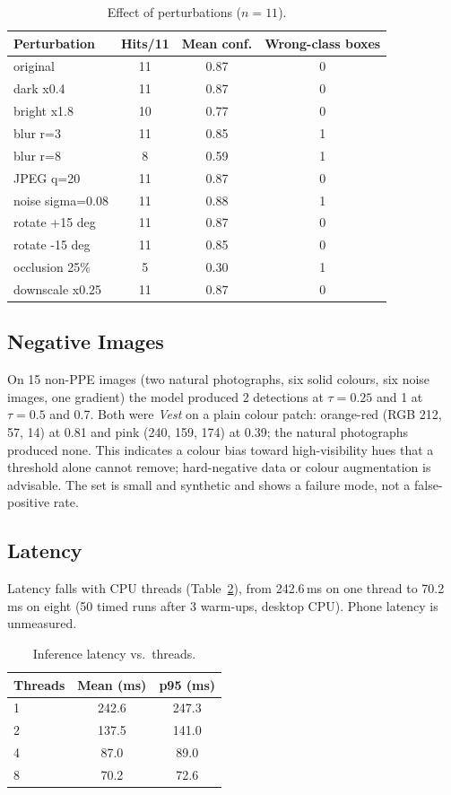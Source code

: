 \documentclass[conference]{IEEEtran}
\begin{document}
\begin{table}[t]
\caption{Effect of perturbations ($n=11$).}
\label{tab:pert}
\centering\footnotesize
\begin{tabular}{lccc}
\toprule
Perturbation & Hits/11 & Mean conf. & Wrong-class boxes \\
\midrule
original & 11 & 0.87 & 0 \\
dark x0.4 & 11 & 0.87 & 0 \\
bright x1.8 & 10 & 0.77 & 0 \\
blur r=3 & 11 & 0.85 & 1 \\
blur r=8 & 8 & 0.59 & 1 \\
JPEG q=20 & 11 & 0.87 & 0 \\
noise sigma=0.08 & 11 & 0.88 & 1 \\
rotate +15 deg & 11 & 0.87 & 0 \\
rotate -15 deg & 11 & 0.85 & 0 \\
occlusion 25\% & 5 & 0.30 & 1 \\
downscale x0.25 & 11 & 0.87 & 0 \\
\bottomrule
\end{tabular}
\end{table}

\subsection{Negative Images}
On 15 non-PPE images (two natural photographs, six solid colours, six noise
images, one gradient) the model produced 2 detections at $\tau=0.25$ and 1 at
$\tau=0.5$ and 0.7. Both were \emph{Vest} on a plain colour patch: orange-red
(RGB 212, 57, 14) at 0.81 and pink (240, 159, 174) at 0.39; the natural photographs
produced none. This indicates a colour bias toward high-visibility hues that a
threshold alone cannot remove; hard-negative data or colour augmentation is
advisable. The set is small and synthetic and shows a failure mode, not a
false-positive rate.

\subsection{Latency}
Latency falls with CPU threads (Table~\ref{tab:lat}), from 242.6\,ms on one
thread to 70.2\,ms on eight (50 timed runs after 3 warm-ups, desktop CPU). Phone
latency is unmeasured.

\begin{table}[t]
\caption{Inference latency vs.\ threads.}
\label{tab:lat}
\centering\footnotesize
\begin{tabular}{lcc}
\toprule
Threads & Mean (ms) & p95 (ms)\\
\midrule
1 & 242.6 & 247.3 \\
2 & 137.5 & 141.0 \\
4 & 87.0 & 89.0 \\
8 & 70.2 & 72.6 \\
\bottomrule
\end{tabular}
\end{table}
\end{document}
